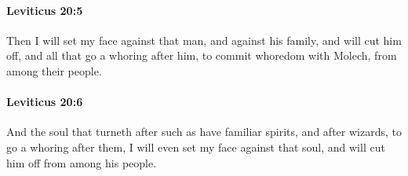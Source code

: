 		\paragraph{Leviticus 20:5} %
			\label{LEVITICUS-20-5}

			Then I will set my face against that man, and against his family, and will cut him off, and all that go a whoring after him, to commit whoredom with Molech, from among their people.


		\paragraph{Leviticus 20:6} %
			\label{LEVITICUS-20-6}

			And the soul that turneth after such as have familiar spirits, and after wizards, to go a whoring after them, I will even set my face against that soul, and will cut him off from among his people.

